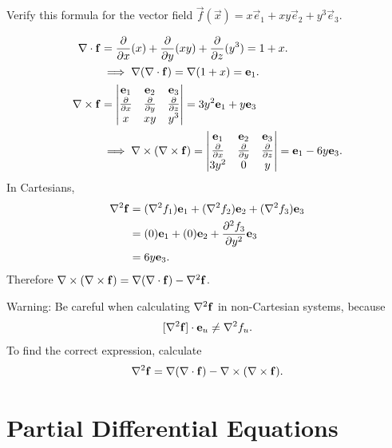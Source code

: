 \documentclass[10pt, a4paper]{article}
\begin{document}
\begin{example}
    Verify this formula for the vector field $\vec{f}(\vec{x}) = x\vec{e}_1 + xy\vec{e}_2 + y ^ 3\vec{e}_3$.

    \begin{align*}
        \mathbf{\nabla} \cdot \mathbf{f} &= \frac{\partial }{\partial x}(x) + \frac{\partial }{\partial y}(xy) + \frac{\partial }{\partial z}(y ^ 3) = 1 + x. \\
        &\implies \mathbf{\nabla} (\mathbf{\nabla} \cdot \mathbf{f}) = \mathbf{\nabla}(1 + x) = \mathbf{e}_1. \\
        \mathbf{\nabla}\times\mathbf{f} &= \begin{vmatrix}
            \mathbf{e}_1 & \mathbf{e}_2 & \mathbf{e}_3 \\
            \frac{\partial }{\partial x} & \frac{\partial }{\partial y} & \frac{\partial }{\partial z} \\
            x & xy & y ^ 3
        \end{vmatrix} = 3y ^ 2\mathbf{e}_1 + y\mathbf{e}_3 \\
        &\implies \mathbf{\nabla} \times (\mathbf{\nabla} \times \mathbf{f}) = \begin{vmatrix}
            \mathbf{e}_1 & \mathbf{e}_2 & \mathbf{e}_3 \\ \frac{\partial }{\partial x} & \frac{\partial }{\partial y} & \frac{\partial }{\partial z} \\ 3y ^ 2 & 0 & y
        \end{vmatrix} = \mathbf{e}_1 - 6y\mathbf{e}_3.
    \end{align*}
    In Cartesians,
    \begin{align*}
        \mathbf{\nabla} ^ 2\mathbf{f} &= (\nabla ^ 2f_1)\mathbf{e}_1 + (\nabla ^ 2f_2)\mathbf{e}_2 + (\nabla ^ 2f_3)\mathbf{e}_3 \\
        &= (0)\mathbf{e}_1 + (0)\mathbf{e}_2 + \frac{\partial ^ 2f_3}{\partial y ^ 2}\mathbf{e}_3 \\
        &= 6y\mathbf{e}_3.
    \end{align*}
    Therefore $\mathbf{\nabla} \times (\mathbf{\nabla} \times \mathbf{f}) = \mathbf{\nabla}(\mathbf{\nabla} \cdot \mathbf{f}) - \mathbf{\nabla} ^ 2\mathbf{f}$.
\end{example}

Warning:
Be careful when calculating $\mathbf{\nabla} ^ 2\mathbf{f}$ in non-Cartesian systems,
because
\[
[\mathbf{\nabla} ^ 2\mathbf{f}]\cdot\mathbf{e}_u \neq \nabla ^ 2f_u.
\]
To find the correct expression,
calculate
\[
\mathbf{\nabla} ^ 2\mathbf{f} = \mathbf{\nabla}(\mathbf{\nabla}\cdot\mathbf{f}) - \mathbf{\nabla}\times(\mathbf{\nabla}\times\mathbf{f}).
\]

\newpage

\section{Partial Differential Equations}
\end{document}

